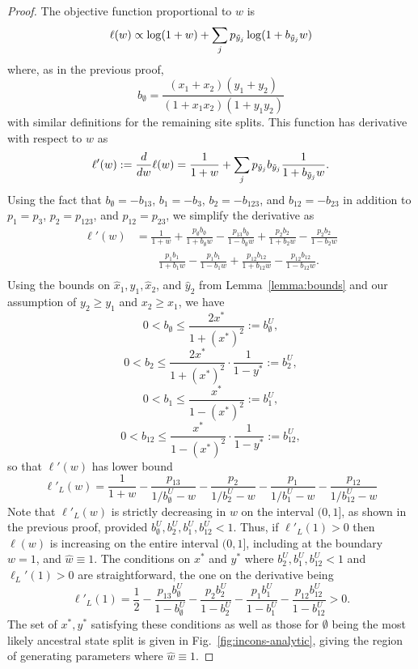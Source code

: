 \begin{proof}
The objective function proportional to $w$ is
\begin{align*}
\ell(w) \propto \log(1+w) + \sum_j p_{\tilde{y}_j} \log(1 + b_{\tilde{y}_j}w)
\end{align*}
where, as in the previous proof,
\[
b_{\emptyset} = \frac{(x_1+x_2)(y_1+y_2)}{(1+x_1x_2)(1+y_1y_2)}
\]
with similar definitions for the remaining site splits.
This function has derivative with respect to $w$ as
\begin{align*}
\ell'(w) := \frac{d}{dw} \ell(w) = \frac{1}{1+w} + \sum_j p_{\tilde{y}_j}b_{\tilde{y}_j}\frac{1}{1 + b_{\tilde{y}_j}w}.
\end{align*}
Using the fact that $b_{\emptyset} = -b_{13}$, $b_{1} = -b_{3}$, $b_{2} = -b_{123}$, and $b_{12} = -b_{23}$ in addition to $p_{1} = p_{3}$, $p_{2} = p_{123}$, and $p_{12} = p_{23}$, we simplify the derivative as
\begin{align*}
\ell'(w) &= \frac{1}{1+w} + \frac{p_{\emptyset}b_{\emptyset}}{1 + b_{\emptyset}w} - \frac{p_{13}b_{\emptyset}}{1 - b_{\emptyset}w} + \frac{p_{2}b_{2}}{1 + b_{2}w} - \frac{p_{2}b_{2}}{1 - b_{2}w} \\
         &\qquad \frac{p_{1}b_{1}}{1 + b_{1}w} - \frac{p_{1}b_{1}}{1 - b_{1}w} + \frac{p_{12}b_{12}}{1 + b_{12}w} - \frac{p_{12}b_{12}}{1 - b_{12}w}.\\
\end{align*}
Using the bounds on $\hat{x}_1,\hat{y}_1,\hat{x}_2$, and $\hat{y}_2$ from Lemma~\ref{lemma:bounds} and our assumption of $y_2 \ge y_1$ and $x_2 \ge x_1$, we have
\[
0 < b_{\emptyset} \le \frac{2x^*}{1+(x^*)^2} := b_{\emptyset}^U,
\]
\[
0 < b_{2} \le \frac{2x^*}{1+(x^*)^2}\cdot\frac{1}{1-y^*} := b_{2}^U,
\]
\[
0 < b_{1} \le \frac{x^*}{1-(x^*)^2} := b_{1}^U,
\]
\[
0 < b_{12} \le \frac{x^*}{1-(x^*)^2}\cdot\frac{1}{1-y^*} := b_{12}^U,
\]
so that $\ell'(w)$ has lower bound
\[
\ell'_{L}(w) = \frac{1}{1+w} - \frac{p_{13}}{1/b_{\emptyset}^U - w} - \frac{p_{2}}{1/b_{2}^U - w} - \frac{p_{1}}{1/b_{1}^U - w} - \frac{p_{12}}{1/b_{12}^U - w}
\]
Note that $\ell'_{L}(w)$ is strictly decreasing in $w$ on the interval $(0,1]$, as shown in the previous proof, provided $b_{\emptyset}^U, b_{2}^U, b_{1}^U, b_{12}^U < 1$.
Thus, if $\ell'_{L}(1) > 0$ then $\ell(w)$ is increasing on the entire interval $(0,1]$, including at the boundary $w=1$, and $\hat{w} \equiv 1$.
The conditions on $x^*$ and $y^*$ where $b_{2}^U, b_{1}^U, b_{12}^U < 1$ and $\ell_L'(1) > 0$ are straightforward, the one on the derivative being
\[
\ell'_{L}(1) = \frac{1}{2} - \frac{p_{13}b_{\emptyset}^U}{1-b_{\emptyset}^U} - \frac{p_{2}b_{2}^U}{1-b_{2}^U} - \frac{p_{1}b_{1}^U}{1-b_{1}^U} - \frac{p_{12}b_{12}^U}{1-b_{12}^U} > 0.
\]
The set of $x^*,y^*$ satisfying these conditions as well as those for $\emptyset$ being the most likely ancestral state split is given in Fig.~\ref{fig:incons-analytic}, giving the region of generating parameters where $\hat{w}\equiv 1$.
\end{proof}

